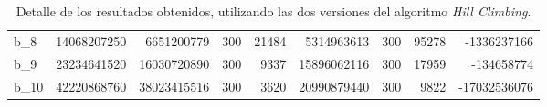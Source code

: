 \documentclass[../informe2.tex]{subfiles}
\begin{document}
\begin{table}[h]
{\begin{tabular}{@{}lrrrrrrrr@{}}
b\_8      & 14068207250                 & 6651200779             & 300                        & 21484                           & 5314963613                & 300                        & 95278                           & -1336237166                    \\
b\_9      & 23234641520                 & 16030720890            & 300                        & 9337                            & 15896062116               & 300                        & 17959                           & -134658774                     \\
b\_10     & 42220868760                 & 38023415516            & 300                        & 3620                            & 20990879440               & 300                        & 9822                            & -17032536076                   \\ \bottomrule
\end{tabular}}
\caption{\small Detalle de los resultados obtenidos, utilizando las dos versiones del algoritmo \textit{Hill Climbing}.}\label{tabla:hc-comparative}
\end{table}


\begin{figure}[ht]
	\caption{\small}\label{fig:comparativa-hc}
\end{figure}
\end{document}
